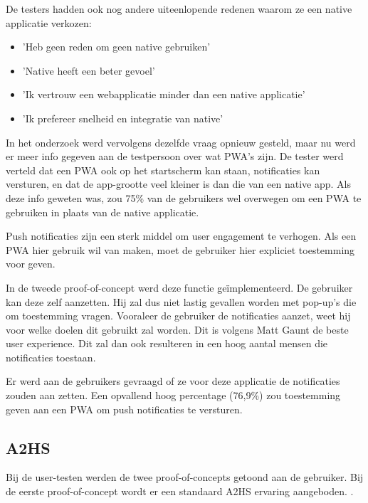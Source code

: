 		De testers hadden ook nog andere uiteenlopende redenen waarom ze een native applicatie verkozen:
		\begin{itemize}
	  		\item 'Heb geen reden om geen native gebruiken'
	  		\item 'Native heeft een beter gevoel'
	  		\item 'Ik vertrouw een webapplicatie minder dan een native applicatie'
	  		\item 'Ik prefereer snelheid en integratie van native'
	  	\end{itemize}	
			  	
		In het onderzoek werd vervolgens dezelfde vraag opnieuw gesteld, maar nu werd er meer info gegeven aan de testpersoon over wat PWA's zijn. De tester werd verteld dat een PWA ook op het startscherm kan staan, notificaties kan versturen, en dat de app-grootte veel kleiner is dan die van een native app. 
		Als deze info geweten was, zou 75\% van de gebruikers wel overwegen om een PWA te gebruiken in plaats van de native applicatie.

		
		Push notificaties zijn een sterk middel om user engagement te verhogen. \autocite{Gaunt2020} Als een PWA hier gebruik wil van maken, moet de gebruiker hier expliciet toestemming voor geven. 
		
		In de tweede proof-of-concept werd deze functie geïmplementeerd. De gebruiker kan deze zelf aanzetten. Hij zal dus niet lastig gevallen worden met pop-up's die om toestemming vragen. Vooraleer de gebruiker de notificaties aanzet, weet hij voor welke doelen dit gebruikt zal worden. Dit is volgens Matt Gaunt de beste user experience. Dit zal dan ook resulteren in een hoog aantal mensen die notificaties toestaan. \autocite{Gaunt2019c}
		
		Er werd aan de gebruikers gevraagd of ze voor deze applicatie de notificaties zouden aan zetten. Een opvallend hoog percentage (76,9\%) zou toestemming geven aan een PWA om push notificaties te versturen.
		
		
		
	\subsection{A2HS}
		Bij de user-testen werden de twee proof-of-concepts getoond aan de gebruiker. Bij de eerste proof-of-concept wordt er een standaard A2HS ervaring aangeboden. .
		
